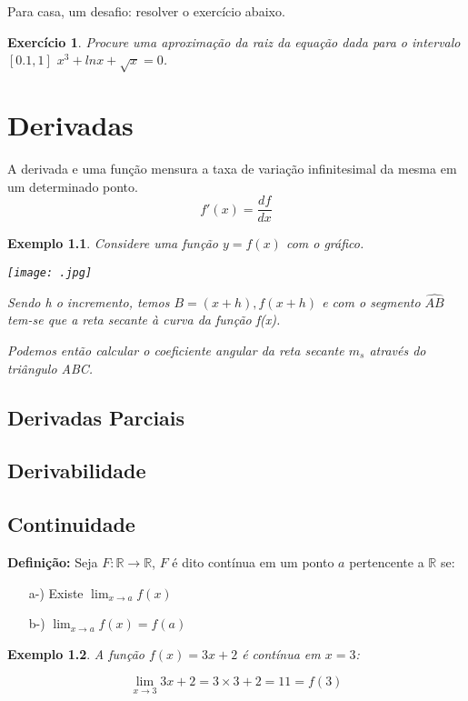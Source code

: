 \documentclass{book}
\numberwithin{defn}{chapter}
\newtheorem{exe}{Exemplo}
\numberwithin{exe}{chapter}
\newtheorem{ex}{Exercício}
\numberwithin{ex}{chapter}
\numberwithin{obs}{chapter}
\numberwithin{fato}{chapter}
\numberwithin{resp}{chapter}
\begin{document}
Para casa, um desafio: resolver o exercício abaixo.
\begin{ex}
    Procure uma aproximação da raiz da equação dada para o intervalo $[0.1,1]$ $x^3+lnx+\sqrt{x}=0$.
\end{ex}


\chapter{Derivadas} %
A derivada e uma função mensura a taxa de variação infinitesimal da mesma em um determinado ponto.
\[f'(x) = \frac{df}{dx}\]

\begin{exe}
    Considere uma função $y=f(x)$ com o gráfico.
    
\begin{center}\texttt{[image: .jpg]}\end{center}

Sendo h o incremento, temos $B=(x+h),f(x+h)$ e com o segmento $\widehat{AB}$ tem-se que a reta secante à curva da função f(x).

Podemos então calcular o coeficiente angular da reta secante $m_s$ através do triângulo ABC.
\[\]

\end{exe}

\section{Derivadas Parciais} 
\section{Derivabilidade} %
\section{Continuidade} %

\textbf{Definição:} Seja \( F: \mathbb{R} \rightarrow \mathbb{R} \), \( F \) é dito contínua em um ponto \( a \) pertencente a \( \mathbb{R} \) se:

\begin{itemize}
    \item[a-)] Existe \( \lim_{x \to a} f(x) \)
    \item[b-)] \( \lim_{x \to a} f(x) = f(a) \)
\end{itemize}

\begin{exe} A função \( f(x) = 3x + 2 \) é contínua em \( x = 3 \):

\[
\lim_{x \to 3} 3x + 2 = 3 \times 3 + 2 = 11 = f(3)
\]
\end{exe}
\end{document}
